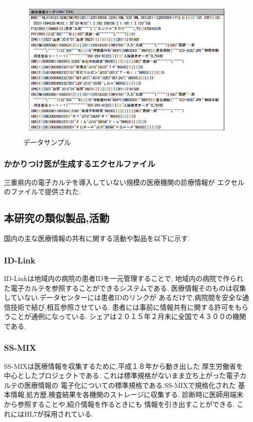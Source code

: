 	\begin{figure}[htbp]
    \begin{center}
			\includegraphics[width=12cm, bb=0 0 688 437, clip]{./gazou/ss-mix_sampledata.png}
    \end{center}
    \caption{データサンプル}
		\label{ss-mix_sampledata}
	\end{figure}



  \subsubsection{かかりつけ医が生成するエクセルファイル}
  三重県内の電子カルテを導入していない規模の医療機関の診療情報が
  エクセルのファイルで提供された.



\subsection{本研究の類似製品,活動}
  国内の主な医療情報の共有に関する活動や製品を以下に示す.


  \subsubsection{ID-Link}
    ID-Linkは地域内の病院の患者IDを一元管理することで,
    地域内の病院で作られた電子カルテを参照することができるシステムである.
    医療情報そのものは収集していない.データセンターには患者IDのリンクが
    あるだけで,病院間を安全な通信技術で結び,相互参照させている.
    患者には事前に情報共有に関する許可をもらうことが通例になっている.
    シェアは２０１５年２月末に全国で４３００の機関である.

  \subsubsection{SS-MIX} \cite{bibi7}
    SS-MIXは医療情報を収集するために,平成１８年から動き出した
    厚生労働省を中心としたプロジェクトである.
    これは標準規格がないまま立ち上がった電子カルテの医療情報の
    電子化についての標準規格である.SS-MIXで規格化された
    基本情報,処方歴,検査結果を各機関のストレージに収集する.
    診断時に医師用端末から参照することや,紹介情報を作るときにも
    情報を引き出すことができる.
    これにはHL7が採用されている.

